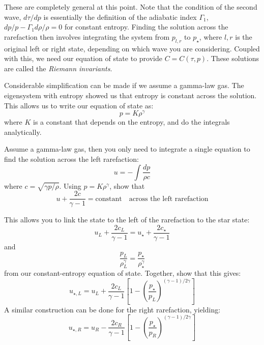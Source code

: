 These are completely general at this point.  Note that the condition
of the second wave, $d\tau/dp$ is essentially the definition of the
adiabatic index $\Gamma_1$, $dp/p - \Gamma_1 d\rho/\rho = 0$ for
constant entropy.  Finding the solution across the rarefaction then
involves integrating the system from $p_{l,r}$ to $p_\star$, where $l,
r$ is the original left or right state, depending on which wave you
are considering.  Coupled with this, we need our equation of state to
provide $C = C(\tau, p)$.  These solutions are called the {\em Riemann
  invariants}.

Considerable simplification can be made if we assume a gamma-law gas.
The eigensystem with entropy showed us that entropy is constant across
the solution.  This allows us to write our equation of state as:
\begin{equation}
p = K \rho^\gamma
\end{equation}
where $K$ is a constant that depends on the entropy, and do the 
integrals analytically.

\begin{exercise}
Assume a gamma-law gas, then you only need to integrate a single
equation to find the solution across the left rarefaction:
\begin{equation}
u = - \int \frac{dp}{\rho c}
\end{equation}
where $c = \sqrt{\gamma p/\rho}$.  Using $p = K\rho^\gamma$, show that
\begin{equation}
u + \frac{2c}{\gamma - 1} = \mbox{constant} \quad \mbox{across the left rarefaction}
\end{equation}

This allows you to link the state to the left of the rarefaction to the star state:
\begin{equation}
u_L + \frac{2c_L}{\gamma - 1} = u_\star + \frac{2c_\star}{\gamma -1}
\end{equation}
and
\begin{equation}
\frac{p_L}{\rho_L^\gamma} = \frac{p_\star}{\rho_\star^\gamma}
\end{equation}
from our constant-entropy equation of state.  Together, show that this
gives:
\begin{equation}
u_{\star,L} = u_L + \frac{2c_L}{\gamma - 1} \left [ 1 - \left ( \frac{p_\star}{p_L}\right )^{(\gamma - 1)/2\gamma} \right ]
\end{equation}
A similar construction can be done for the right rarefaction, yielding:
\begin{equation}
u_{\star,R} = u_R - \frac{2c_R}{\gamma - 1} \left [ 1 - \left ( \frac{p_\star}{p_R}\right )^{(\gamma - 1)/2\gamma} \right ]
\end{equation}

\end{exercise}

